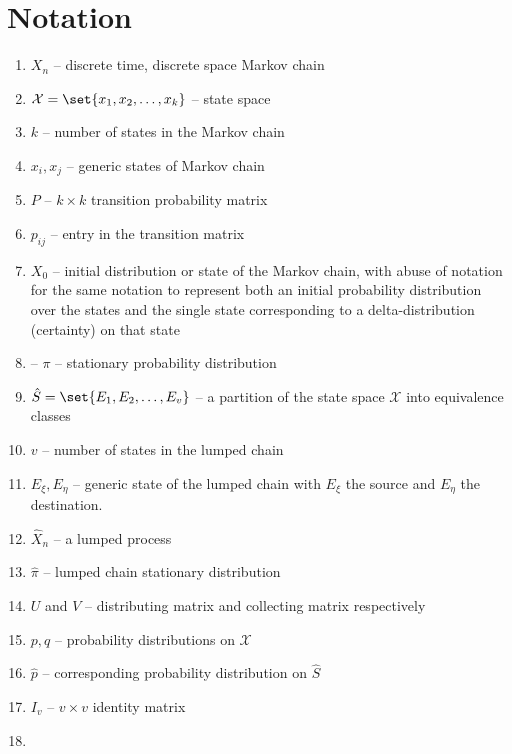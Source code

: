 \documentclass[12pt]{article}
\begin{document}
\section*{Notation}
\begin{enumerate}
    \item
        \( X_n \) -- discrete time, discrete space Markov chain
    \item
        \( \mathcal{X} = \set{x_1, x_2, \dots, x_k} \) -- state space
    \item
        \( k \) -- number of states in the Markov chain
    \item
        \( x_i, x_j \) -- generic states of Markov chain
    \item
        \( P \) -- \( k \times k \) transition probability matrix
    \item
        \( p_{ij} \) -- entry in the transition matrix
    \item
        \( X_0 \) -- initial distribution or state of the Markov chain,
        with abuse of notation for the same notation to represent both
        an initial probability distribution over the states and the
        single state corresponding to a delta-distribution (certainty)
        on that state
    \item
        -- \( \pi \) -- stationary probability distribution
    \item
        \( \hat{S} = \set{E_1, E_2, \dots, E_v} \) -- a partition of the
        state space \( \mathcal{X} \) into equivalence classes
    \item
        \( v \) -- number of states in the lumped chain
    \item
        \( E_{\xi}, E_{\eta} \) -- generic state of the lumped chain
        with \( E_{\xi} \) the source and \( E_{\eta} \) the
        destination.
    \item
        \( \hat{X}_n \) -- a lumped process
    \item
        \( \hat{\pi} \) -- lumped chain stationary distribution
    \item
        \( U \) and \( V \) -- distributing matrix and collecting matrix
        respectively
    \item
        \( p, q \) -- probability distributions on \( \mathcal{X} \)
    \item
        \( \hat{p} \) -- corresponding probability distribution on \(
        \hat{S} \)
    \item
        \( I_v \) -- \( v \times v \) identity matrix
    \item

\end{enumerate}
\end{document}
